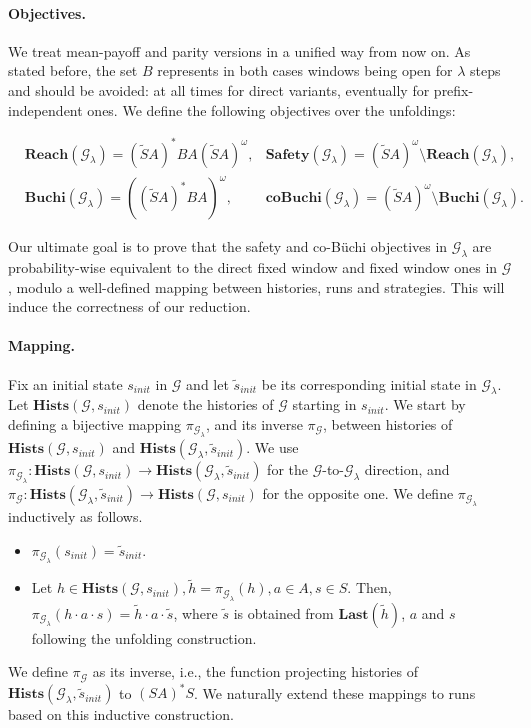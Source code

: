 \documentclass{article}
\newcommand{\CG}{\mathcal{G}}
\newcommand{\Hists}{\textbf{Hists}}
\newcommand{\Last}{\textbf{Last}}
\newcommand{\Reach}{\textbf{Reach}}
\newcommand{\Safety}{\textbf{Safety}}
\newcommand{\Buchi}{\textbf{Buchi}}
\newcommand{\coBuchi}{\textbf{coBuchi}}
\theoremstyle{plain}
\begin{document}
\paragraph{Objectives.}
We treat mean-payoff and parity versions in a unified way from now on.  As stated before, the set $B$ represents in both cases windows being open for $\lambda$ steps and should be avoided: at all times for direct variants, eventually for prefix-independent ones. We define the following objectives over the unfoldings:

\begin{align*}
&\Reach(\CG_{\lambda}) = (\tilde{S}A)^*BA(\tilde{S}A)^{\omega}, & \Safety(\CG_{\lambda}) = (\tilde{S}A)^{\omega} \setminus \Reach(\CG_{\lambda}),\\
&\Buchi(\CG_{\lambda}) = ((\tilde{S}A)^*BA)^{\omega}, & \coBuchi(\CG_{\lambda}) = (\tilde{S}A)^{\omega} \setminus \Buchi(\CG_{\lambda}).
\end{align*}

Our ultimate goal is to prove that the safety and co-Büchi objectives in $\CG_{\lambda}$ are probability-wise equivalent to the direct fixed window and fixed window ones in $\CG$, modulo a well-defined mapping between histories, runs and strategies. This will induce the correctness of our reduction.

\paragraph{Mapping.}
Fix an initial state $s_{init}$ in $\CG$ and let $\tilde{s}_{init}$ be its corresponding initial state in $\CG_{\lambda}$. Let $\Hists(\CG, s_{init})$ denote the histories of $\CG$ starting in $s_{init}$. We start by defining a bijective mapping $\pi_{\CG_{\lambda}}$, and its inverse $\pi_{\CG}$, between histories of $\Hists(\CG, s_{init})$ and $\Hists(\CG_{\lambda}, \tilde{s}_{init})$. We use $\pi_{\CG_{\lambda}}: \Hists(\CG, s_{init}) \rightarrow \Hists(\CG_{\lambda}, \tilde{s}_{init})$ for the $\CG$-to-$\CG_{\lambda}$ direction, and $\pi_{\CG}: \Hists(\CG_{\lambda}, \tilde{s}_{init}) \rightarrow \Hists(\CG, s_{init})$ for the opposite one. We define $\pi_{\CG_{\lambda}}$ inductively as follows.
\begin{itemize}
\item $\pi_{\CG_{\lambda}}(s_{init}) = \tilde{s}_{init}$.
\item Let $h \in \Hists(\CG, s_{init}), \tilde{h} = \pi_{\CG_{\lambda}}(h), a \in A, s \in S$. Then, $\pi_{\CG_{\lambda}}(h \cdot a \cdot s) = \tilde{h} \cdot a \cdot \tilde{s}$, where $\tilde{s}$ is obtained from $\Last(\tilde{h})$, $a$ and $s$ following the unfolding construction.
\end{itemize}
We define $\pi_{\CG}$ as its inverse, i.e., the function projecting histories of $\Hists(\CG_{\lambda}, \tilde{s}_{init})$ to $(SA)^*S$. We naturally extend these mappings to runs based on this inductive construction.
\end{document}
